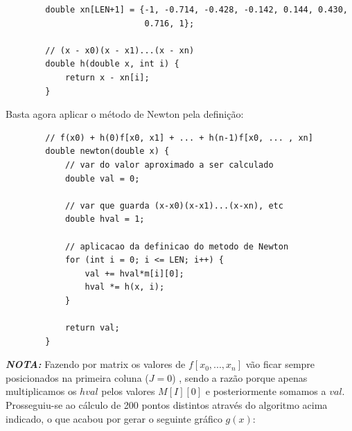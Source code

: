 \documentclass[12pt, letterpaper,fleqn]{article}
\begin{document}
\begin{itemize}
    \begin{verbatim}
        double xn[LEN+1] = {-1, -0.714, -0.428, -0.142, 0.144, 0.430, 
                            0.716, 1};
                            
        // (x - x0)(x - x1)...(x - xn)
        double h(double x, int i) {
            return x - xn[i];
        }
    \end{verbatim}

    Basta agora aplicar o método de Newton pela definição:

    \begin{verbatim}
        // f(x0) + h(0)f[x0, x1] + ... + h(n-1)f[x0, ... , xn]
        double newton(double x) {
            // var do valor aproximado a ser calculado
            double val = 0;
        
            // var que guarda (x-x0)(x-x1)...(x-xn), etc
            double hval = 1;
        
            // aplicacao da definicao do metodo de Newton
            for (int i = 0; i <= LEN; i++) {
                val += hval*m[i][0];
                hval *= h(x, i);
            }
            
            return val;
        }
    \end{verbatim}

    \textbf{\textit{NOTA:}} Fazendo por matrix os valores de $f[x_0, ... , x_n]$ vão ficar sempre posicionados na primeira coluna ($J=0$) , sendo a razão porque apenas multiplicamos os $hval$ pelos valores $M[I][0]$ e posteriormente somamos a $val$. \\

    Prosseguiu-se ao cálculo de 200 pontos distintos através do algoritmo acima indicado, o que acabou por gerar o seguinte gráfico $g(x)$:

    \begin{quote}
        \centering
    \end{quote}
    

\end{itemize}
\end{document}
